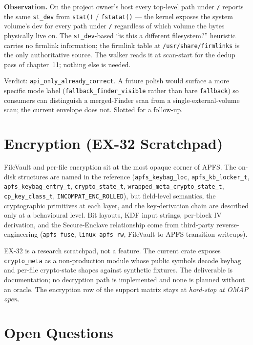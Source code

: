 \textbf{Observation.} On the project owner's host every
top-level path under \texttt{/} reports the same \texttt{st\_dev}
from \texttt{stat()} / \texttt{fstatat()} --- the kernel exposes
the system volume's dev for every path under \texttt{/} regardless
of which volume the bytes physically live on. The
\texttt{st\_dev}-based ``is this a different filesystem?''
heuristic carries no firmlink information; the firmlink table at
\texttt{/usr/share/firmlinks} is the only authoritative source.
The walker reads it at scan-start for the dedup pass of
chapter~11; nothing else is needed.

Verdict: \texttt{api\_only\_already\_correct}. A future polish
would surface a more specific mode label
(\texttt{fallback\_finder\_visible} rather than bare
\texttt{fallback}) so consumers can distinguish a merged-Finder
scan from a single-external-volume scan; the current envelope
does not. Slotted for a follow-up.

\section{Encryption (EX-32 Scratchpad)}

FileVault and per-file encryption sit at the most opaque corner
of APFS. The on-disk structures are named in the reference
(\texttt{apfs\_keybag\_loc}, \texttt{apfs\_kb\_locker\_t},
\texttt{apfs\_keybag\_entry\_t}, \texttt{crypto\_state\_t},
\texttt{wrapped\_meta\_crypto\_state\_t}, \texttt{cp\_key\_class\_t},
\texttt{INCOMPAT\_ENC\_ROLLED}), but field-level semantics, the
cryptographic primitives at each layer, and the key-derivation
chain are described only at a behavioural level. Bit layouts,
KDF input strings, per-block IV derivation, and the Secure-Enclave
relationship come from third-party reverse-engineering
(\texttt{apfs-fuse}, \texttt{linux-apfs-rw}, FileVault-to-APFS
transition writeups).

EX-32 is a research scratchpad, not a feature. The current crate
exposes \texttt{crypto\_meta} as a non-production module whose
public symbols decode keybag and per-file crypto-state shapes
against synthetic fixtures. The deliverable is documentation; no
decryption path is implemented and none is planned without an
oracle. The encryption row of the support matrix stays at
\emph{hard-stop at OMAP open}.

\section{Open Questions}

